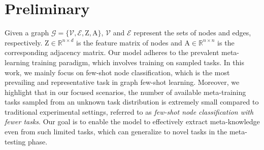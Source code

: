 \section{Preliminary}
Given a graph $\mathcal{G}\!=\!\{\mathcal{V},\mathcal{E},\mathrm{Z},\mathrm{A}\}$, $\mathcal{V}$ and $\mathcal{E}$ represent the sets of nodes and edges, respectively. $\mathrm{Z}\!\in\!\mathbb R^{n\times d}$ is the feature matrix of nodes and $\mathrm{A}\!\in\!\mathbb R^{n\times n}$ is the corresponding adjacency matrix. Our model adheres to the prevalent meta-learning training paradigm, which involves training on sampled tasks. %
In this work, we mainly focus on few-shot node classification, which is the most prevailing and representative task in graph few-shot learning. Moreover, we highlight that in our focused scenarios, the number of available meta-training tasks sampled from an unknown task distribution is extremely small compared to traditional experimental settings, referred to as \textit{few-shot node classification with fewer tasks}. Our goal is to enable the model to effectively extract meta-knowledge even from such limited tasks, which can generalize to novel tasks in the meta-testing phase. %


